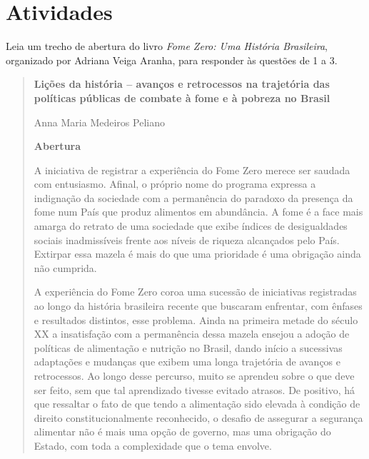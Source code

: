 \section{Atividades}

Leia um trecho de abertura do livro \emph{Fome Zero: Uma História
Brasileira}, organizado por Adriana Veiga Aranha, para responder às
questões de 1 a 3.


\begin{quote}
\textbf{Lições da história -- avanços e retrocessos na trajetória das
políticas públicas de combate à fome e à pobreza no Brasil}

Anna Maria Medeiros Peliano

\textbf{Abertura}


A iniciativa de registrar a experiência do Fome Zero merece ser saudada
com entusiasmo. Afinal, o próprio nome do programa expressa a indignação
da sociedade com a permanência do paradoxo da presença da fome num País
que produz alimentos em abundância. A fome é a face mais amarga do
retrato de uma sociedade que exibe índices de desigualdades sociais
inadmissíveis frente aos níveis de riqueza alcançados pelo País.
Extirpar essa mazela é mais do que uma prioridade é uma obrigação ainda
não cumprida.

A experiência do Fome Zero coroa uma sucessão de iniciativas registradas
ao longo da história brasileira recente que buscaram enfrentar, com
ênfases e resultados distintos, esse problema. Ainda na primeira metade
do século XX a insatisfação com a permanência dessa mazela ensejou a
adoção de políticas de alimentação e nutrição no Brasil, dando início a
sucessivas adaptações e mudanças que exibem uma longa trajetória de
avanços e retrocessos. Ao longo desse percurso, muito se aprendeu sobre
o que deve ser feito, sem que tal aprendizado tivesse evitado atrasos.
De positivo, há que ressaltar o fato de que tendo a alimentação sido
elevada à condição de direito constitucionalmente reconhecido, o desafio
de assegurar a segurança alimentar não é mais uma opção de governo, mas
uma obrigação do Estado, com toda a complexidade que o tema envolve.


\end{quote}
